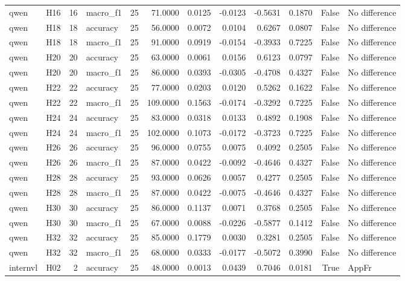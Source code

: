 \begin{table}[tbp]
\begin{tabular}{llrlrrrrrrrl}
qwen & H16 & 16 & macro\_f1 & 25 & 71.0000 & 0.0125 & -0.0123 & -0.5631 & 0.1870 & False & No difference \\
qwen & H18 & 18 & accuracy & 25 & 56.0000 & 0.0072 & 0.0104 & 0.6267 & 0.0807 & False & No difference \\
qwen & H18 & 18 & macro\_f1 & 25 & 91.0000 & 0.0919 & -0.0154 & -0.3933 & 0.7225 & False & No difference \\
qwen & H20 & 20 & accuracy & 25 & 63.0000 & 0.0061 & 0.0156 & 0.6123 & 0.0797 & False & No difference \\
qwen & H20 & 20 & macro\_f1 & 25 & 86.0000 & 0.0393 & -0.0305 & -0.4708 & 0.4327 & False & No difference \\
qwen & H22 & 22 & accuracy & 25 & 77.0000 & 0.0203 & 0.0120 & 0.5262 & 0.1622 & False & No difference \\
qwen & H22 & 22 & macro\_f1 & 25 & 109.0000 & 0.1563 & -0.0174 & -0.3292 & 0.7225 & False & No difference \\
qwen & H24 & 24 & accuracy & 25 & 83.0000 & 0.0318 & 0.0133 & 0.4892 & 0.1908 & False & No difference \\
qwen & H24 & 24 & macro\_f1 & 25 & 102.0000 & 0.1073 & -0.0172 & -0.3723 & 0.7225 & False & No difference \\
qwen & H26 & 26 & accuracy & 25 & 96.0000 & 0.0755 & 0.0075 & 0.4092 & 0.2505 & False & No difference \\
qwen & H26 & 26 & macro\_f1 & 25 & 87.0000 & 0.0422 & -0.0092 & -0.4646 & 0.4327 & False & No difference \\
qwen & H28 & 28 & accuracy & 25 & 93.0000 & 0.0626 & 0.0057 & 0.4277 & 0.2505 & False & No difference \\
qwen & H28 & 28 & macro\_f1 & 25 & 87.0000 & 0.0422 & -0.0075 & -0.4646 & 0.4327 & False & No difference \\
qwen & H30 & 30 & accuracy & 25 & 86.0000 & 0.1137 & 0.0071 & 0.3768 & 0.2505 & False & No difference \\
qwen & H30 & 30 & macro\_f1 & 25 & 67.0000 & 0.0088 & -0.0226 & -0.5877 & 0.1412 & False & No difference \\
qwen & H32 & 32 & accuracy & 25 & 85.0000 & 0.1779 & 0.0030 & 0.3281 & 0.2505 & False & No difference \\
qwen & H32 & 32 & macro\_f1 & 25 & 68.0000 & 0.0333 & -0.0177 & -0.5072 & 0.3990 & False & No difference \\
internvl & H02 & 2 & accuracy & 25 & 48.0000 & 0.0013 & 0.0439 & 0.7046 & 0.0181 & True & AppFr \\

\end{tabular}
\end{table}
